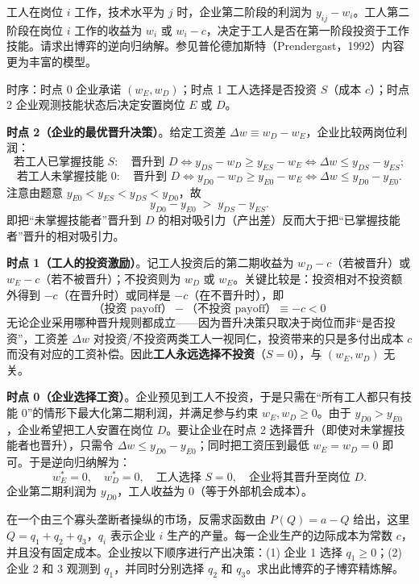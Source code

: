 工人在岗位 $i$ 工作，技术水平为 $j$ 时，企业第二阶段的利润为 $y_{ij}-w_i$。工人第二阶段在岗位 $i$ 工作的收益为 $w_i$ 或 $w_i-c$，决定于工人是否在第一阶段投资于工作技能。请求出博弈的逆向归纳解。参见普伦德加斯特（Prendergast，1992）内容更为丰富的模型。

\sol
时序：时点 0 企业承诺 $(w_E,w_D)$；时点 1 工人选择是否投资 $S$（成本 $c$）；时点 2 企业观测技能状态后决定安置岗位 $E$ 或 $D$。

\textbf{时点 2（企业的最优晋升决策）}。给定工资差 $\Delta w\equiv w_D-w_E$，企业比较两岗位利润：
\[
\text{若工人已掌握技能 }S:\quad \text{晋升到 }D\iff y_{DS}-w_D\ge y_{ES}-w_E
\iff \Delta w\le y_{DS}-y_{ES};
\]\indent
\[
\text{若工人未掌握技能 }0:\quad \text{晋升到 }D\iff y_{D0}-w_D\ge y_{E0}-w_E
\iff \Delta w\le y_{D0}-y_{E0}.
\]\indent
注意由题意 $y_{E0}<y_{ES}<y_{DS}<y_{D0}$，故
\[
y_{D0}-y_{E0} \;>\; y_{DS}-y_{ES}.
\tag{$\dagger$}
\]\indent
即把“未掌握技能者”晋升到 $D$ 的相对吸引力（产出差）反而大于把“已掌握技能者”晋升的相对吸引力。

\textbf{时点 1（工人的投资激励）}。记工人投资后的第二期收益为 $w_D-c$（若被晋升）或 $w_E-c$（若不被晋升）；不投资则为 $w_D$ 或 $w_E$。关键比较是：投资相对不投资额外得到 $-c$（在晋升时）或同样是 $-c$（在不晋升时），即
\[
\text{（投资 payoff）}-\text{（不投资 payoff）}\equiv -c<0
\]\indent
无论企业采用哪种晋升规则都成立——因为晋升决策只取决于岗位而非“是否投资”，工资差 $\Delta w$ 对投资/不投资两类工人一视同仁，投资带来的只是多付出成本 $c$ 而没有对应的工资补偿。因此\textbf{工人永远选择不投资}（$S=0$），与 $(w_E,w_D)$ 无关。

\textbf{时点 0（企业选择工资）}。企业预见到工人不投资，于是只需在“所有工人都只有技能 0”的情形下最大化第二期利润，并满足参与约束 $w_E,w_D\ge 0$。由于 $y_{D0}>y_{E0}$，企业希望把工人安置在岗位 $D$。要让企业在时点 2 选择晋升（即使对未掌握技能者也晋升），只需令 $\Delta w\le y_{D0}-y_{E0}$；同时把工资压到最低 $w_E=w_D=0$ 即可。于是逆向归纳解为：
\[
w_E^*=0,\quad w_D^*=0,\quad \text{工人选择 }S=0,\quad \text{企业将其晋升至岗位 }D.
\]\indent
企业第二期利润为 $y_{D0}$，工人收益为 $0$（等于外部机会成本）。


在一个由三个寡头垄断者操纵的市场，反需求函数由 $P(Q)=a-Q$ 给出，这里 $Q=q_1+q_2+q_3$，$q_i$ 表示企业 $i$ 生产的产量。每一企业生产的边际成本为常数 $c$，并且没有固定成本。企业按以下顺序进行产出决策：(1) 企业 1 选择 $q_1\ge 0$；(2) 企业 2 和 3 观测到 $q_1$，并同时分别选择 $q_2$ 和 $q_3$。求出此博弈的子博弈精炼解。

